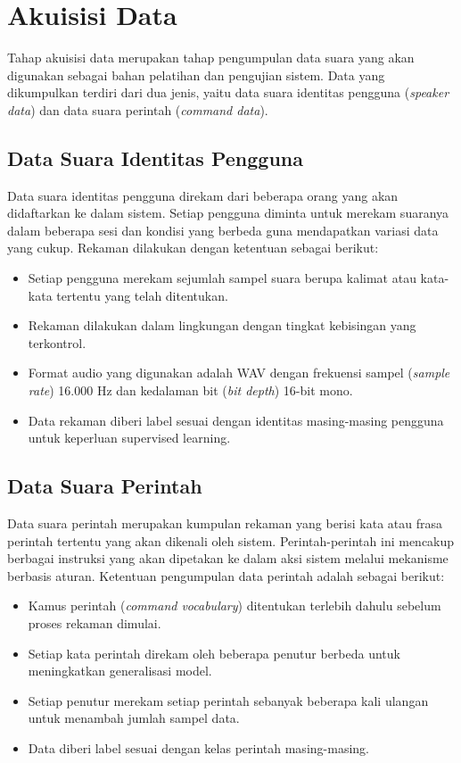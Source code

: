 \section{Akuisisi Data}

Tahap akuisisi data merupakan tahap pengumpulan data suara yang akan digunakan sebagai bahan pelatihan dan pengujian sistem. Data yang dikumpulkan terdiri dari dua jenis, yaitu data suara identitas pengguna (\textit{speaker data}) dan data suara perintah (\textit{command data}).

\subsection*{Data Suara Identitas Pengguna}

Data suara identitas pengguna direkam dari beberapa orang yang akan didaftarkan ke dalam sistem. Setiap pengguna diminta untuk merekam suaranya dalam beberapa sesi dan kondisi yang berbeda guna mendapatkan variasi data yang cukup. Rekaman dilakukan dengan ketentuan sebagai berikut:
\begin{itemize}
    \item Setiap pengguna merekam sejumlah sampel suara berupa kalimat atau kata-kata tertentu yang telah ditentukan.
    \item Rekaman dilakukan dalam lingkungan dengan tingkat kebisingan yang terkontrol.
    \item Format audio yang digunakan adalah WAV dengan frekuensi sampel (\textit{sample rate}) 16.000 Hz dan kedalaman bit (\textit{bit depth}) 16-bit mono.
    \item Data rekaman diberi label sesuai dengan identitas masing-masing pengguna untuk keperluan supervised learning.
\end{itemize}

\subsection*{Data Suara Perintah}

Data suara perintah merupakan kumpulan rekaman yang berisi kata atau frasa perintah tertentu yang akan dikenali oleh sistem. Perintah-perintah ini mencakup berbagai instruksi yang akan dipetakan ke dalam aksi sistem melalui mekanisme berbasis aturan. Ketentuan pengumpulan data perintah adalah sebagai berikut:
\begin{itemize}
    \item Kamus perintah (\textit{command vocabulary}) ditentukan terlebih dahulu sebelum proses rekaman dimulai.
    \item Setiap kata perintah direkam oleh beberapa penutur berbeda untuk meningkatkan generalisasi model.
    \item Setiap penutur merekam setiap perintah sebanyak beberapa kali ulangan untuk menambah jumlah sampel data.
    \item Data diberi label sesuai dengan kelas perintah masing-masing.
\end{itemize}

